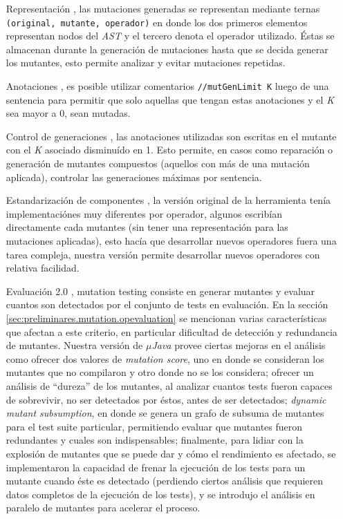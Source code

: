 \begin{enumerate}
	\item[Representaci\'on], las mutaciones generadas se representan mediante ternas \texttt{(original, mutante, operador)} en donde los dos primeros elementos representan nodos del \emph{AST} y el tercero denota el operador utilizado. \'Estas se almacenan durante la generaci\'on de mutaciones hasta que se decida generar los mutantes, esto permite analizar y evitar mutaciones repetidas.
	\item[Anotaciones], es posible utilizar comentarios \lstinline|//mutGenLimit K| luego de una sentencia para permitir que solo aquellas que tengan estas anotaciones y el \emph{K} sea mayor a 0, sean mutadas.
	\item[Control de generaciones], las anotaciones utilizadas son escritas en el mutante con el \emph{K} asociado disminu\'ido en 1. Esto permite, en casos como reparaci\'on o generaci\'on de mutantes compuestos (aquellos con m\'as de una mutaci\'on aplicada), controlar las generaciones m\'aximas por sentencia.
	\item[Estandarizaci\'on de componentes], la versi\'on original de la herramienta ten\'ia implementaci\'ones muy diferentes por operador, algunos escrib\'ian directamente cada mutantes (sin tener una representaci\'on para las mutaciones aplicadas), esto hac\'ia que desarrollar nuevos operadores fuera una tarea compleja, nuestra versi\'on permite desarrollar nuevos operadores con relativa facilidad.
	\item[Evaluaci\'on 2.0], mutation testing consiste en generar mutantes y evaluar cuantos son detectados por el conjunto de tests en evaluaci\'on. En la secci\'on \ref{sec:preliminares.mutation.opevaluation} se mencionan varias caracter\'isticas que afectan a este criterio, en particular dificultad de detecci\'on y redundancia de mutantes. Nuestra versi\'on de \emph{$\mu$Java} provee ciertas mejoras en el an\'alisis como ofrecer dos valores de \emph{mutation score}, uno en donde se consideran los mutantes que no compilaron y otro donde no se los considera; ofrecer un an\'alisis de ``dureza'' de los mutantes, al analizar cuantos tests fueron capaces de sobrevivir, no ser detectados por \'estos, antes de ser detectados; \emph{dynamic mutant subsumption}, en donde se genera un grafo de subsuma de mutantes para el test suite particular, permitiendo evaluar que mutantes fueron redundantes y cuales son indispensables; finalmente, para lidiar con la explosi\'on de mutantes que se puede dar y c\'omo el rendimiento es afectado, se implementaron la capacidad de frenar la ejecuci\'on de los tests para un mutante cuando \'este es detectado (perdiendo ciertos an\'alisis que requieren datos completos de la ejecuci\'on de los tests), y se introdujo el an\'alisis en paralelo de mutantes para acelerar el proceso.
\end{enumerate}

